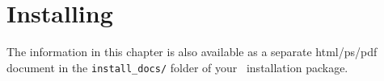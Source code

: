 \chapter{Installing \MCS}
\label{installing}
The information in this chapter is also available as a separate
html/ps/pdf document in the \texttt{install\_docs/} folder of your
\MCS\ installation package.

% 

